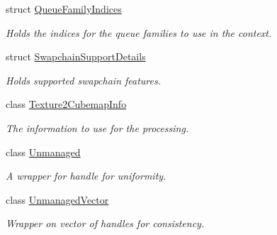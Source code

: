 \begin{DoxyCompactItemize}
struct \hyperlink{structblaze_1_1util_1_1QueueFamilyIndices}{Queue\+Family\+Indices}
\begin{DoxyCompactList}\small\item\em Holds the indices for the queue families to use in the context. \end{DoxyCompactList}\item 
struct \hyperlink{structblaze_1_1util_1_1SwapchainSupportDetails}{Swapchain\+Support\+Details}
\begin{DoxyCompactList}\small\item\em Holds supported swapchain features. \end{DoxyCompactList}\item 
class \hyperlink{structblaze_1_1util_1_1Texture2CubemapInfo}{Texture2\+Cubemap\+Info}
\begin{DoxyCompactList}\small\item\em The information to use for the processing. \end{DoxyCompactList}\item 
class \hyperlink{classblaze_1_1util_1_1Unmanaged}{Unmanaged}
\begin{DoxyCompactList}\small\item\em A wrapper for handle for uniformity. \end{DoxyCompactList}\item 
class \hyperlink{classblaze_1_1util_1_1UnmanagedVector}{Unmanaged\+Vector}
\begin{DoxyCompactList}\small\item\em Wrapper on vector of handles for consistency. \end{DoxyCompactList}\end{DoxyCompactItemize}
